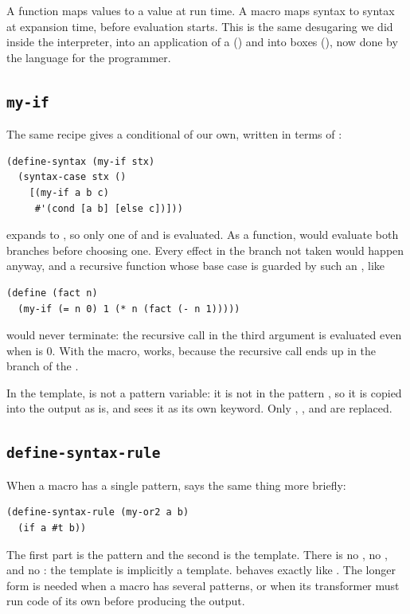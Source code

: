 \begin{keypoint}
A function maps values to a value at run time. A macro maps syntax to syntax at expansion time, before evaluation starts. This is the same desugaring we did inside the interpreter,  into an application of a  () and  into boxes (), now done by the language for the programmer.
\end{keypoint}

\subsection{\texttt{my-if}}

The same recipe gives a conditional of our own, written in terms of :
\begin{lstlisting}
(define-syntax (my-if stx)
  (syntax-case stx ()
    [(my-if a b c)
     #'(cond [a b] [else c])]))
\end{lstlisting}
 expands to , so only one of  and  is evaluated. As a function,  would evaluate both branches before choosing one. Every effect in the branch not taken would happen anyway, and a recursive function whose base case is guarded by such an , like
\begin{lstlisting}
(define (fact n)
  (my-if (= n 0) 1 (* n (fact (- n 1)))))
\end{lstlisting}
would never terminate: the recursive call in the third argument is evaluated even when  is 0. With the macro,  works, because the recursive call ends up in the  branch of the .

\begin{remark}
In the template,  is not a pattern variable: it is not in the pattern , so it is copied into the output as is, and  sees it as its own  keyword. Only , , and  are replaced.
\end{remark}

\subsection{\texttt{define-syntax-rule}}

When a macro has a single pattern,  says the same thing more briefly:
\begin{lstlisting}
(define-syntax-rule (my-or2 a b)
  (if a #t b))
\end{lstlisting}
The first part is the pattern and the second is the template. There is no , no , and no : the template is implicitly a  template.  behaves exactly like . The longer  form is needed when a macro has several patterns, or when its transformer must run code of its own before producing the output.

